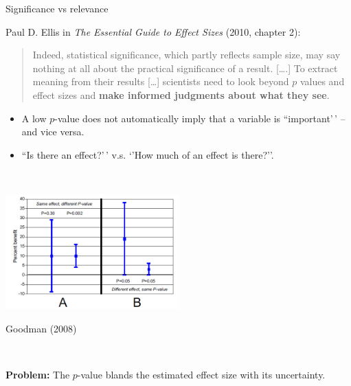 \documentclass[
  10pt,
  ignorenonframetext,
]{beamer}
\providecommand{\tightlist}{%
  \setlength{\itemsep}{0pt}\setlength{\parskip}{0pt}}
\begin{document}
\begin{frame}
\begin{block}{Significance vs relevance}
\protect\hypertarget{significance-vs-relevance}{}
\(~\)

Paul D. Ellis in \emph{The Essential Guide to Effect Sizes} (2010,
chapter 2):

\vspace{6mm}

\begin{quote}
Indeed, statistical significance, which partly reflects sample size, may
say nothing at all about the practical significance of a result.
{[}\ldots.{]} To extract meaning from their results {[}\ldots{]}
scientists need to look beyond \(p\) values and effect sizes and
\textbf{make informed judgments about what they see}.
\end{quote}

\vspace{6mm}
\end{block}
\end{frame}

\begin{frame}
\vspace{2mm}

\begin{itemize}
\tightlist
\item
  A low \(p\)-value does not automatically imply that a variable is
  ``important'\,' -- and vice versa.
\end{itemize}

\vspace{2mm}

\begin{itemize}
\tightlist
\item
  ``Is there an effect?'\,' v.s. `'How much of an effect is there?''.
\end{itemize}

\(~\)

\flushleft

\centering

\includegraphics[width=0.5\textwidth,height=\textheight]{graphics/pValueEffectSize.jpg}

\vspace{2mm}

\scriptsize

Goodman (2008)

\flushleft
\normalsize

\(~\)

\textbf{Problem:} The \(p\)-value blands the estimated effect size with
its uncertainty.
\end{frame}
\end{document}
